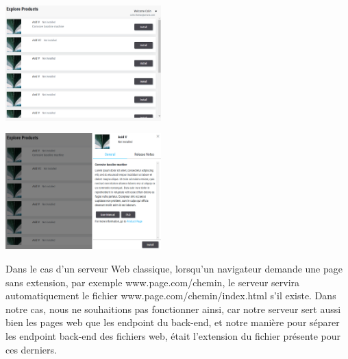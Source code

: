 \documentclass[francais]{rapportPFE}  %
\begin{document}
\begin{center}
    \centering
    \begin{minipage}{.5\textwidth}
    \centering
    \includegraphics[width=6cm]{graphics/vue_demo.png}
    \label{fig:test1}
    \end{minipage}%
    \begin{minipage}{.5\textwidth}
    \centering
    \includegraphics[width=6cm]{graphics/vue_demo2.png}
    \label{fig:test2}
    \end{minipage}
    \end{center}

Dans le cas d'un serveur Web classique, lorsqu'un navigateur demande une page sans extension, par exemple www.page.com/chemin, le serveur servira automatiquement le fichier www.page.com/chemin/index.html s'il existe. Dans notre cas, nous ne souhaitions pas fonctionner ainsi, car notre serveur sert aussi bien les pages web que les endpoint du back-end, et notre manière pour séparer les endpoint back-end des fichiers web, était l'extension du fichier présente pour ces derniers. 
    
\end{document}
